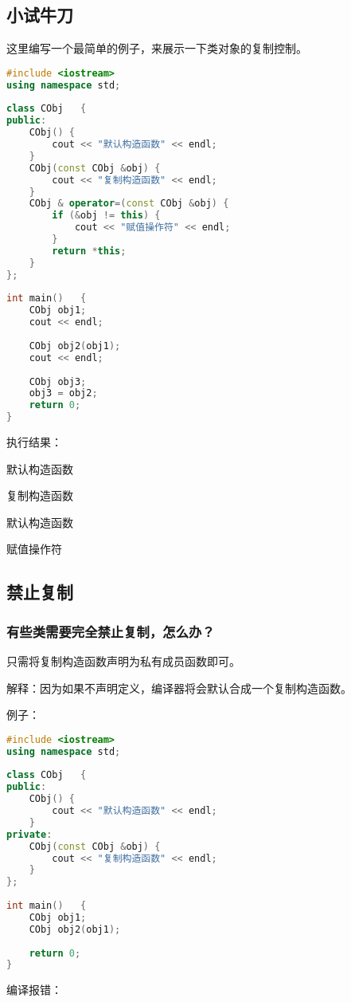 \documentclass{article}
\begin{document}
\subsection{小试牛刀}
\label{sec-5-4}
这里编写一个最简单的例子，来展示一下类对象的复制控制。
\begin{lstlisting}[language=c++]
#include <iostream>  
using namespace std;  
  
class CObj   {  
public:  
    CObj() {      
        cout << "默认构造函数" << endl;  
    }  
    CObj(const CObj &obj) {      
        cout << "复制构造函数" << endl;  
    }  
    CObj & operator=(const CObj &obj) {      
        if (&obj != this) {          
            cout << "赋值操作符" << endl;  
        }  
        return *this;  
    }  
};  
  
int main()   {  
    CObj obj1;  
    cout << endl;  
  
    CObj obj2(obj1);  
    cout << endl;  
  
    CObj obj3;  
    obj3 = obj2;  
    return 0;  
}  
\end{lstlisting}

执行结果：

默认构造函数  

复制构造函数  

默认构造函数  

赋值操作符  
\subsection{禁止复制}
\label{sec-5-5}
\subsubsection{有些类需要完全禁止复制，怎么办？}
\label{sec-5-5-1}

只需将复制构造函数声明为私有成员函数即可。

解释：因为如果不声明定义，编译器将会默认合成一个复制构造函数。

例子：
\begin{lstlisting}[language=c++]
#include <iostream>  
using namespace std;  
  
class CObj   {  
public:  
    CObj() {      
        cout << "默认构造函数" << endl;  
    }  
private:  
    CObj(const CObj &obj) {      
        cout << "复制构造函数" << endl;  
    }  
};  
  
int main()   {  
    CObj obj1;  
    CObj obj2(obj1);  
  
    return 0;  
}  

\end{lstlisting}
编译报错：
\end{document}
